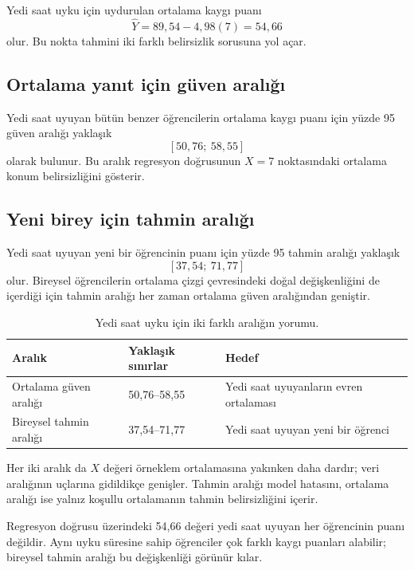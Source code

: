 Yedi saat uyku için uydurulan ortalama kaygı puanı
\[
\hat Y=89{,}54-4{,}98(7)=54{,}66
\]
olur. Bu nokta tahmini iki farklı belirsizlik sorusuna yol açar.

\subsection{Ortalama yanıt için güven aralığı}

Yedi saat uyuyan bütün benzer öğrencilerin ortalama kaygı puanı için yüzde 95
güven aralığı yaklaşık
\[
[50{,}76;\ 58{,}55]
\]
olarak bulunur. Bu aralık regresyon doğrusunun $X=7$ noktasındaki ortalama
konum belirsizliğini gösterir.

\subsection{Yeni birey için tahmin aralığı}

Yedi saat uyuyan yeni bir öğrencinin puanı için yüzde 95 tahmin aralığı
yaklaşık
\[
[37{,}54;\ 71{,}77]
\]
olur. Bireysel öğrencilerin ortalama çizgi çevresindeki doğal değişkenliğini de
içerdiği için tahmin aralığı her zaman ortalama güven aralığından geniştir.

\begin{table}[htbp]
\centering
\caption{Yedi saat uyku için iki farklı aralığın yorumu.}
\begin{tabular}{@{}p{}p{}p{}@{}}
\toprule
Aralık & Yaklaşık sınırlar & Hedef \\
\midrule
Ortalama güven aralığı & 50,76--58,55 & Yedi saat uyuyanların evren ortalaması \\
Bireysel tahmin aralığı & 37,54--71,77 & Yedi saat uyuyan yeni bir öğrenci \\
\bottomrule
\end{tabular}
\end{table}

Her iki aralık da $X$ değeri örneklem ortalamasına yakınken daha dardır; veri
aralığının uçlarına gidildikçe genişler. Tahmin aralığı model hatasını,
ortalama aralığı ise yalnız koşullu ortalamanın tahmin belirsizliğini içerir.

\begin{mistakebox}
Regresyon doğrusu üzerindeki 54,66 değeri yedi saat uyuyan her öğrencinin
puanı değildir. Aynı uyku süresine sahip öğrenciler çok farklı kaygı puanları
alabilir; bireysel tahmin aralığı bu değişkenliği görünür kılar.
\end{mistakebox}

